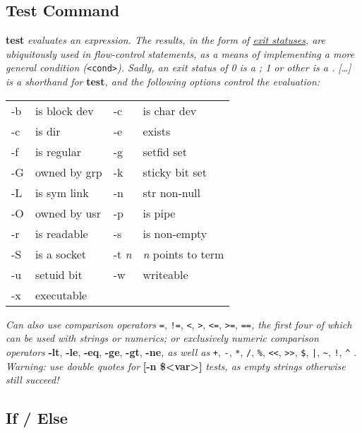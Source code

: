 \subsection*{Test Command}
\textbf{test}\textit{ evaluates an expression. The results, in the form of \ul{exit statuses}, are ubiquitously used in flow-control statements, as a means of implementing a more general condition (}\texttt{<cond>}\textit{). Sadly, an exit status of 0 is a ; 1 or other is a . [\dots] is a shorthand for }\textbf{test}\textit{, and the following options control the evaluation:}
\begin{tabular}{l l l l}
    -b      & is block dev      & -c    & is char dev       \\
    -c      & is dir            & -e    & exists            \\
    -f      & is regular        & -g    & setfid set        \\
    -G      & owned by grp      & -k    & sticky bit set    \\
    -L      & is sym link       & -n    & str non-null      \\
    -O      & owned by usr      & -p    & is pipe           \\
    -r      & is readable       & -s    & is non-empty      \\
    -S      & is a socket       & -t \textit{n}    & \textit{n} points to term     \\
    -u      & setuid bit        & -w    & writeable         \\
    -x      & executable
\end{tabular} 

\textit{Can also use comparison operators }\texttt{=}, \texttt{!=}, \texttt{<}, \texttt{>}, \texttt{<=}, \texttt{>=}, \texttt{==}\textit{, the first four of which can be used with strings or numerics; or exclusively numeric comparison operators }\textbf{-lt}, \textbf{-le}, \textbf{-eq}, \textbf{-ge}, \textbf{-gt}, \textbf{-ne}\textit{, as well as } \texttt{+}, \texttt{-}, \texttt{*}, \texttt{/}, \texttt{\%}, \texttt{<{}<}, \texttt{>{}>}, \texttt{\$}, \texttt{|}, \texttt{\textasciitilde}, \texttt{!}, \texttt{\textasciicircum}\textit{ . {\color{red}Warning:} use double quotes for }\textbf{[-n \textquotedbl\$<var>\textquotedbl]}\textit{ tests, as empty strings otherwise still succeed!}



\subsection*{If / Else}

